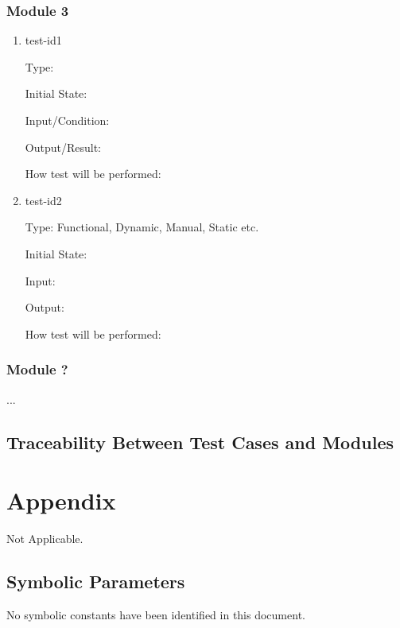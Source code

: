 \documentclass[12pt, titlepage]{article}
\begin{document}
\subsubsection{Module 3}
		
\begin{enumerate}

\item{test-id1\\}

Type: 
					
Initial State: 
					
Input/Condition: 
					
Output/Result: 
					
How test will be performed: 
					
\item{test-id2\\}

Type: Functional, Dynamic, Manual, Static etc.
					
Initial State: 
					
Input: 
					
Output: 
					
How test will be performed: 

\end{enumerate}

\subsubsection{Module ?}

...

\subsection{Traceability Between Test Cases and Modules}

				




\newpage

\section{Appendix}
Not Applicable.

\subsection{Symbolic Parameters}

No symbolic constants have been identified in this document.
\end{document}
